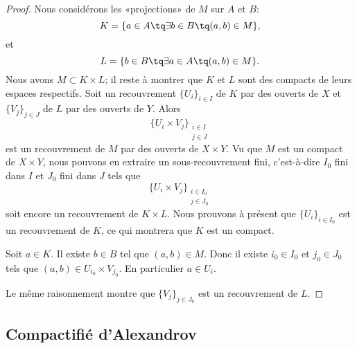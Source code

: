 \begin{proof}
    Nous considérons les «projections» de \( M\) sur \( A\) et \( B\):
    \begin{equation}
        K=\{ a\in A\tq \exists b\in B\tq (a,b)\in M \},
    \end{equation}
    et
    \begin{equation}
        L=\{ b\in B\tq \exists a\in A\tq (a,b)\in M \}.
    \end{equation}
    Nous avons \( M\subset K\times L\); il reste à montrer que \( K\) et \( L\) sont des compacts de leurs espaces respectifs. Soit un recouvrement \( \{ U_i \}_{i\in I} \) de \( K\) par des ouverts de \( X\) et \( \{ V_j \}_{j\in J}\) de \( L\) par des ouverts de \( Y\). Alors
    \begin{equation}
        \{ U_i\times  V_j \}_{\substack{i\in I\\j\in J}} 
    \end{equation}
    est un recouvrement de \( M\) par des ouverts de \( X\times Y\). Vu que \( M\) est un compact de \( X\times Y\), nous pouvons en extraire un sous-recouvrement fini, c'est-à-dire \( I_0\) fini dans \( I\) et \( J_0\) fini dans \( J\) tels que
    \begin{equation}
        \{ U_i\times  V_j \}_{\substack{i\in I_0\\j\in J_0}} 
    \end{equation}
    soit encore un recouvrement de \( K\times L\). Nous prouvons à présent que \( \{ U_i \}_{i\in I_0}\) est un recouvrement de \( K\), ce qui montrera que \( K\) est un compact.

    Soit \( a\in K\). Il existe \( b\in B\) tel que \( (a,b)\in M\). Donc il existe \( i_0\in I_0\) et \( j_0\in J_0\) tels que \( (a,b)\in U_{i_0}\times V_{j_0}\). En particulier \( a\in U_i\).

    Le même raisonnement montre que \( \{ V_j \}_{j\in J_0}\) est un recouvrement de \( L\).
\end{proof}

\subsection{Compactifié d'Alexandrov}

